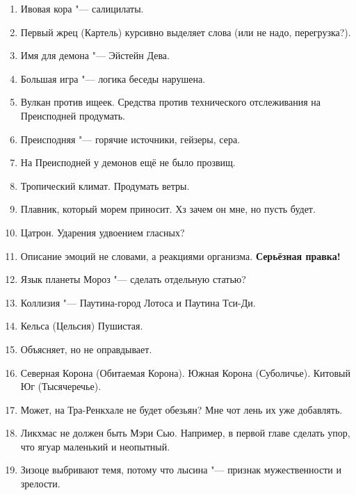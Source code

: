 \begin{enumerate}
\item Ивовая кора "--- салицилаты.

\item Первый жрец (Картель) курсивно выделяет слова (или не надо, перегрузка?).

\item Имя для демона "--- Эйстейн Дева.

\item Большая игра "--- логика беседы нарушена.

\item Вулкан против ищеек.
Средства против технического отслеживания на Преисподней продумать.

\item Преисподняя "--- горячие источники, гейзеры, сера.

\item На Преисподней у демонов ещё не было прозвищ.

\item Тропический климат.
Продумать ветры.

\item Плавник, который морем приносит.
Хз зачем он мне, но пусть будет.

\item Цатрон.
Ударения удвоением гласных?

\item Описание эмоций не словами, а реакциями организма.
\textbf{Серьёзная правка!}

\item Язык планеты Мороз "--- сделать отдельную статью?

\item Коллизия "--- Паутина-город Лотоса и Паутина Тси-Ди.

\item Кельса (Цельсия) Пушистая.

\item Объясняет, но не оправдывает.

\item Северная Корона (Обитаемая Корона).
Южная Корона (Суболичье).
Китовый Юг (Тысячеречье).

\item Может, на Тра-Ренкхале не будет обезьян?
Мне чот лень их уже добавлять.

\item Ликхмас не должен быть Мэри Сью.
Например, в первой главе сделать упор, что ягуар маленький и неопытный.

\item Зизоце выбривают темя, потому что лысина "--- признак мужественности и зрелости.


\end{enumerate}
